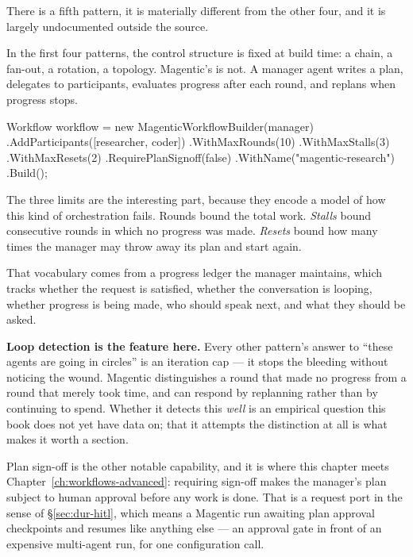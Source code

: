 There is a fifth pattern, it is materially different from the other four, and it
is largely undocumented outside the source.

In the first four patterns, the control structure is fixed at build time: a
chain, a fan-out, a rotation, a topology. Magentic's is not. A manager agent
writes a plan, delegates to participants, evaluates progress after each round,
and replans when progress stops.

\begin{csharp}[caption={A planning manager}, label={lst:orch-magentic}]
Workflow workflow = new MagenticWorkflowBuilder(manager)
    .AddParticipants([researcher, coder])
    .WithMaxRounds(10)
    .WithMaxStalls(3)
    .WithMaxResets(2)
    .RequirePlanSignoff(false)
    .WithName("magentic-research")
    .Build();
\end{csharp}

The three limits are the interesting part, because they encode a model of how
this kind of orchestration fails. Rounds bound the total work. \emph{Stalls}
bound consecutive rounds in which no progress was made. \emph{Resets} bound how
many times the manager may throw away its plan and start again.

That vocabulary comes from a progress ledger the manager maintains, which tracks
whether the request is satisfied, whether the conversation is looping, whether
progress is being made, who should speak next, and what they should be asked.

\begin{note}
\textbf{Loop detection is the feature here.} Every other pattern's answer to
``these agents are going in circles'' is an iteration cap --- it stops the
bleeding without noticing the wound. Magentic distinguishes a round that made no
progress from a round that merely took time, and can respond by replanning rather
than by continuing to spend. Whether it detects this \emph{well} is an empirical
question this book does not yet have data on; that it attempts the distinction at
all is what makes it worth a section.
\end{note}

Plan sign-off is the other notable capability, and it is where this chapter meets
Chapter~\ref{ch:workflows-advanced}: requiring sign-off makes the manager's plan
subject to human approval before any work is done. That is a request port in the
sense of \S\ref{sec:dur-hitl}, which means a Magentic run awaiting plan approval
checkpoints and resumes like anything else --- an approval gate in front of an
expensive multi-agent run, for one configuration call.

